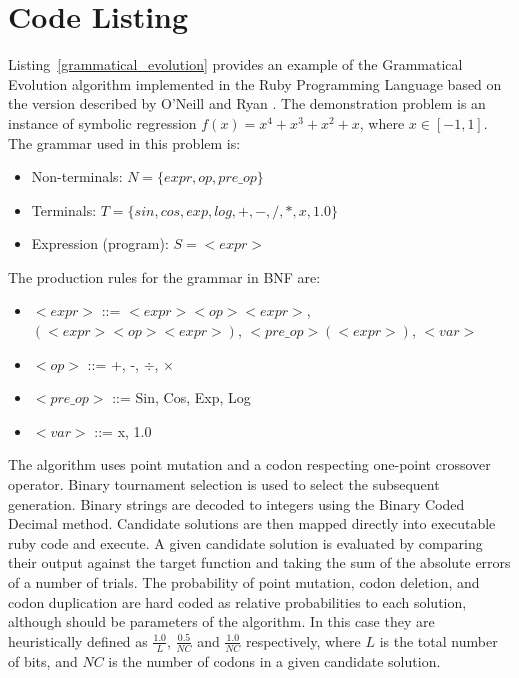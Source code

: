 \documentclass[a4paper, 11pt]{article}
\begin{document}
\section{Code Listing}
\label{sec:code}
Listing~\ref{grammatical_evolution} provides an example of the Grammatical Evolution algorithm implemented in the Ruby Programming Language based on the version described by O'Neill and Ryan \cite{O'Neill2001}.
The demonstration problem is an instance of symbolic regression $f(x)=x^4+x^3+x^2+x$, where $x\in[-1,1]$. 
The grammar used in this problem is: 
\begin{itemize}
	\item Non-terminals: $N=\{expr,op,pre\_op\}$
	\item Terminals: $T=\{sin,cos,exp,log,+,-,/,*,x,1.0\}$
	\item Expression (program): $S=<expr>$
\end{itemize}

The production rules for the grammar in BNF are:
\begin{itemize}
	\item $<expr>$ ::= $<expr><op><expr>$, $(<expr><op><expr>)$, $<pre\_op>(<expr>)$, $<var>$
	\item $<op>$ ::= +, -, $\div$, $\times$
	\item $<pre\_op>$ ::= Sin, Cos, Exp, Log
	\item $<var>$ ::= x, 1.0
\end{itemize}

The algorithm uses point mutation and a codon respecting one-point crossover operator. Binary tournament selection is used to select the subsequent generation. 
Binary strings are decoded to integers using the Binary Coded Decimal method. Candidate solutions are then mapped directly into executable ruby code and execute. A given candidate solution is evaluated by comparing their output against the target function and taking the sum of the absolute errors of a number of trials. The probability of point mutation, codon deletion, and codon duplication are hard coded as relative probabilities to each solution, although should be parameters of the algorithm. In this case they are heuristically defined as $\frac{1.0}{L}$, $\frac{0.5}{NC}$ and $\frac{1.0}{NC}$ respectively, where $L$ is the total number of bits, and $NC$ is the number of codons in a given candidate solution.
\end{document}
